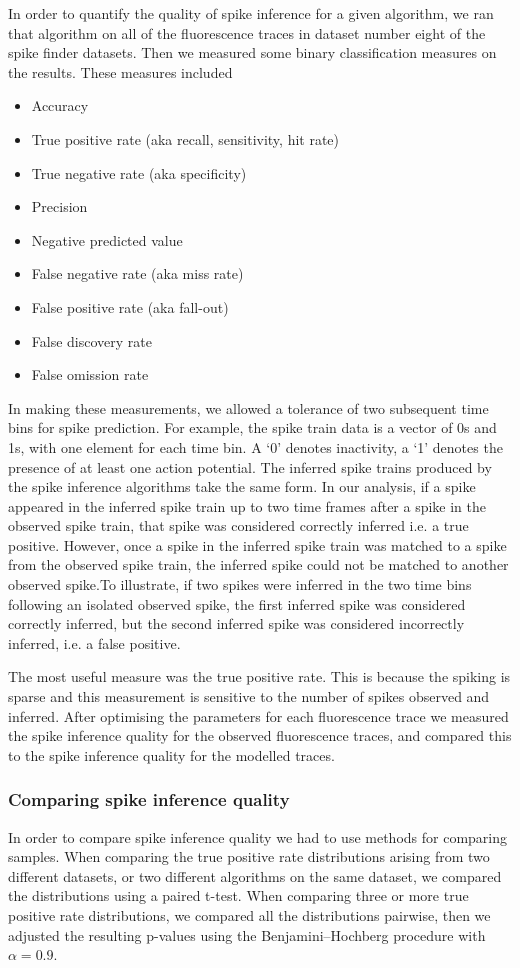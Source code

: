 \documentclass[a4paper,12pt]{article}
\theoremstyle{definition}
\begin{document}
In order to quantify the quality of spike inference for a given algorithm, we ran that algorithm on all of the fluorescence traces in dataset number eight of the spike finder datasets. Then we measured some binary classification measures on the results. These measures included
\begin{itemize}
    \item Accuracy
    \item True positive rate (aka recall, sensitivity, hit rate)
    \item True negative rate (aka specificity)
    \item Precision
    \item Negative predicted value
    \item False negative rate (aka miss rate)
    \item False positive rate (aka fall-out)
    \item False discovery rate
    \item False omission rate
\end{itemize}
In making these measurements, we allowed a tolerance of two subsequent time bins for spike prediction. For example, the spike train data is a vector of 0s and 1s, with one element for each time bin. A `0' denotes inactivity, a `1' denotes the presence of at least one action potential. The inferred spike trains produced by the spike inference algorithms take the same form. In our analysis, if a spike appeared in the inferred spike train up to two time frames after a spike in the observed spike train, that spike was considered correctly inferred i.e. a true positive. However, once a spike in the inferred spike train was matched to a spike from the observed spike train, the inferred spike could not be matched to another observed spike.To illustrate, if two spikes were inferred in the two time bins following an isolated observed spike, the first inferred spike was considered correctly inferred, but the second inferred spike was considered incorrectly inferred, i.e. a false positive. 

The most useful measure was the true positive rate. This is because the spiking is sparse and this measurement is sensitive to the number of spikes observed and inferred. After optimising the parameters for each fluorescence trace we measured the spike inference quality for the observed fluorescence traces, and compared this to the spike inference quality for the modelled traces.

\subsubsection{Comparing spike inference quality}
In order to compare spike inference quality we had to use methods for comparing samples. When comparing the true positive rate distributions arising from two different datasets, or two different algorithms on the same dataset, we compared the distributions using a paired t-test. When comparing three or more true positive rate distributions, we compared all the distributions pairwise, then we adjusted the resulting p-values using the Benjamini–Hochberg procedure with $\alpha = 0.9$.
\end{document}

